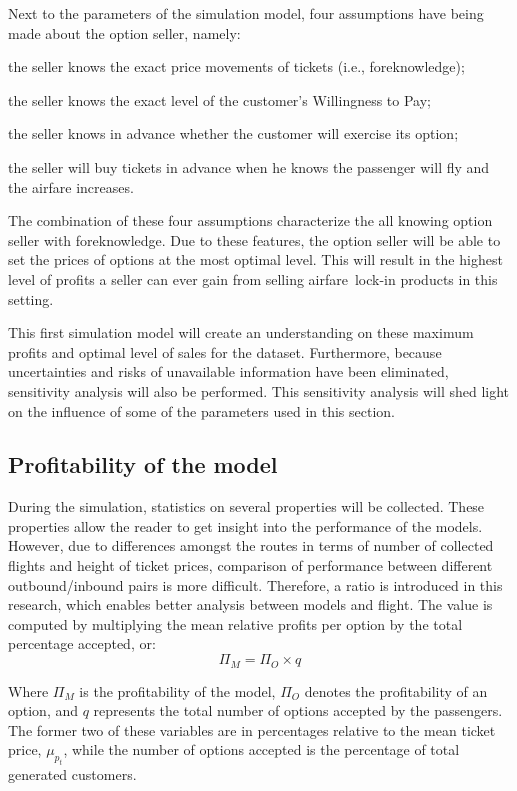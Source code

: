Next to the parameters of the simulation model, four assumptions have being made about the option seller, namely:
\begin{compactenum}
\item the seller knows the exact price movements of tickets (i.e., foreknowledge);
\item the seller knows the exact level of the customer's Willingness to Pay;
\item the seller knows in advance whether the customer will exercise its option;
\item the seller will buy tickets in advance when he knows the passenger will fly and the airfare increases.
\end{compactenum}

\vspace{1em}

The combination of these four assumptions characterize the all knowing option seller with foreknowledge. Due to these features, the option seller will be able to set the prices of options at the most optimal level. This will result in the highest level of profits a seller can ever gain from selling airfare~lock-in products in this setting.

This first simulation model will create an understanding on these maximum profits and optimal level of sales for the dataset. Furthermore, because uncertainties and risks of unavailable information have been eliminated, sensitivity analysis will also be performed. This sensitivity analysis will shed light on the influence of some of the parameters used in this section.


\subsection{Profitability of the model}
\label{subsec:ProfitabilityOfModel}
During the simulation, statistics on several properties will be collected. These properties allow the reader to get insight into the performance of the models. However, due to differences amongst the routes in terms of number of collected flights and height of ticket prices, comparison of performance between different outbound/inbound pairs is more difficult. Therefore, a ratio is introduced in this research, which enables better analysis between models and flight. The value is computed by multiplying the mean relative profits per option by the total percentage accepted, or:
$$\Pi_M = \Pi_O \times q$$

Where $\Pi_M$ is the profitability of the model, $\Pi_O$ denotes the profitability of an option, and $q$ represents the total number of options accepted by the passengers. The former two of these variables are in percentages relative to the mean ticket price, $\mu_{p_t}$, while the number of options accepted is the percentage of total generated customers.

